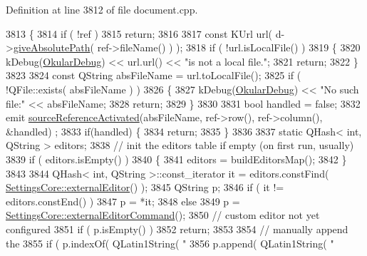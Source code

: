 Definition at line 3812 of file document.\+cpp.


\begin{DoxyCode}
3813 \{
3814     \textcolor{keywordflow}{if} ( !ref )
3815         \textcolor{keywordflow}{return};
3816 
3817     \textcolor{keyword}{const} KUrl url( d->\hyperlink{classOkular_1_1DocumentPrivate_a1c665a65d08f7b032bba757b298e26a6}{giveAbsolutePath}( ref->fileName() ) );
3818     \textcolor{keywordflow}{if} ( !url.isLocalFile() )
3819     \{
3820         kDebug(\hyperlink{debug__p_8h_af16c6e32a95969dd0605d792ec9807c7}{OkularDebug}) << url.url() << \textcolor{stringliteral}{"is not a local file."};
3821         \textcolor{keywordflow}{return};
3822     \}
3823 
3824     \textcolor{keyword}{const} QString absFileName = url.toLocalFile();
3825     \textcolor{keywordflow}{if} ( !QFile::exists( absFileName ) )
3826     \{
3827         kDebug(\hyperlink{debug__p_8h_af16c6e32a95969dd0605d792ec9807c7}{OkularDebug}) << \textcolor{stringliteral}{"No such file:"} << absFileName;
3828         \textcolor{keywordflow}{return};
3829     \}
3830 
3831     \textcolor{keywordtype}{bool} handled = \textcolor{keyword}{false};
3832     emit \hyperlink{classOkular_1_1Document_a7a445d187c36e3c37b282dabbcafe8a0}{sourceReferenceActivated}(absFileName, ref->row(), ref->column(), &handled)
      ;
3833     \textcolor{keywordflow}{if}(handled) \{
3834         \textcolor{keywordflow}{return};
3835     \}
3836 
3837     \textcolor{keyword}{static} QHash< int, QString > editors;
3838     \textcolor{comment}{// init the editors table if empty (on first run, usually)}
3839     \textcolor{keywordflow}{if} ( editors.isEmpty() )
3840     \{
3841         editors = buildEditorsMap();
3842     \}
3843 
3844     QHash< int, QString >::const\_iterator it = editors.constFind( 
      \hyperlink{classOkular_1_1SettingsCore_afb3fbb0d886a4d9619be4f289e091caf}{SettingsCore::externalEditor}() );
3845     QString p;
3846     \textcolor{keywordflow}{if} ( it != editors.constEnd() )
3847         p = *it;
3848     \textcolor{keywordflow}{else}
3849         p = \hyperlink{classOkular_1_1SettingsCore_a2eae0942d8ffbed99c7b9198f2dc03f2}{SettingsCore::externalEditorCommand}();
3850     \textcolor{comment}{// custom editor not yet configured}
3851     \textcolor{keywordflow}{if} ( p.isEmpty() )
3852         \textcolor{keywordflow}{return};
3853 
3854     \textcolor{comment}{// manually append the %
3855     \textcolor{keywordflow}{if} ( p.indexOf( QLatin1String( \textcolor{stringliteral}{"%
3856         p.append( QLatin1String( \textcolor{stringliteral}{" %
}}}
\end{DoxyCode}
